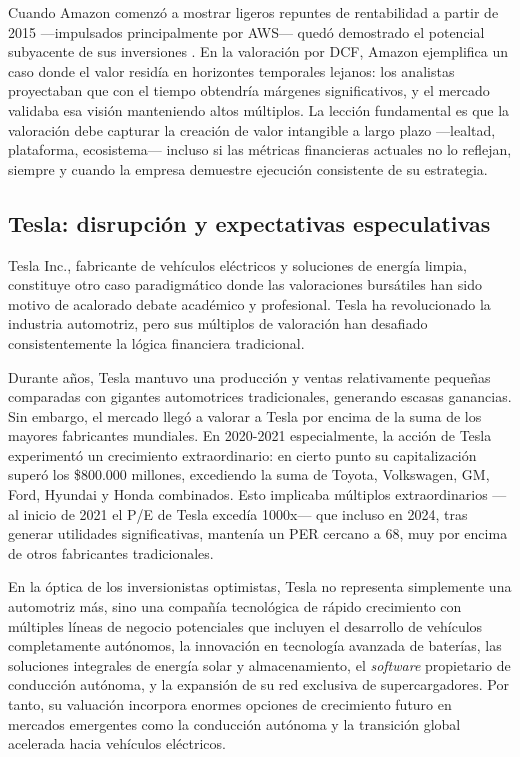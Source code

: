 Cuando Amazon comenzó a mostrar ligeros repuntes de rentabilidad a partir de 2015 ---impulsados principalmente por AWS--- quedó demostrado el potencial subyacente de sus inversiones \citep{damodaran2018}. En la valoración por DCF, Amazon ejemplifica un caso donde el valor residía en horizontes temporales lejanos: los analistas proyectaban que con el tiempo obtendría márgenes significativos, y el mercado validaba esa visión manteniendo altos múltiplos. La lección fundamental es que la valoración debe capturar la creación de valor intangible a largo plazo ---lealtad, plataforma, ecosistema--- incluso si las métricas financieras actuales no lo reflejan, siempre y cuando la empresa demuestre ejecución consistente de su estrategia.

\subsection{Tesla: disrupción y expectativas especulativas}

Tesla Inc., fabricante de vehículos eléctricos y soluciones de energía limpia, constituye otro caso paradigmático donde las valoraciones bursátiles han sido motivo de acalorado debate académico y profesional. Tesla ha revolucionado la industria automotriz, pero sus múltiplos de valoración han desafiado consistentemente la lógica financiera tradicional.

Durante años, Tesla mantuvo una producción y ventas relativamente pequeñas comparadas con gigantes automotrices tradicionales, generando escasas ganancias. Sin embargo, el mercado llegó a valorar a Tesla por encima de la suma de los mayores fabricantes mundiales. En 2020-2021 especialmente, la acción de Tesla experimentó un crecimiento extraordinario: en cierto punto su capitalización superó los \$800.000 millones, excediendo la suma de Toyota, Volkswagen, GM, Ford, Hyundai y Honda combinados. Esto implicaba múltiplos extraordinarios ---al inicio de 2021 el P/E de Tesla excedía 1000x--- que incluso en 2024, tras generar utilidades significativas, mantenía un PER cercano a 68, muy por encima de otros fabricantes tradicionales.

En la óptica de los inversionistas optimistas, Tesla no representa simplemente una automotriz más, sino una compañía tecnológica de rápido crecimiento con múltiples líneas de negocio potenciales que incluyen el desarrollo de vehículos completamente autónomos, la innovación en tecnología avanzada de baterías, las soluciones integrales de energía solar y almacenamiento, el \emph{software} propietario de conducción autónoma, y la expansión de su red exclusiva de supercargadores. Por tanto, su valuación incorpora enormes opciones de crecimiento futuro en mercados emergentes como la conducción autónoma y la transición global acelerada hacia vehículos eléctricos.

